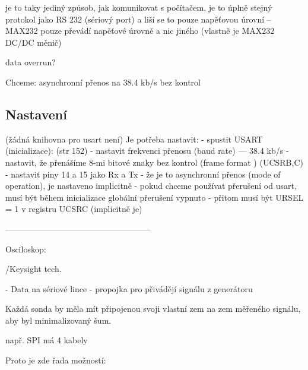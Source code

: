  je to taky jediný způsob, jak komunikovat s počítačem, je to úplně stejný protokol jako RS 232 (sériový port) a liší se to pouze napěťovou úrovní -- MAX232 pouze převádí napěťové úrovně a nic jiného (vlastně je MAX232 DC/DC měnič)
 
 data overrun? 
 
Chceme: asynchronní přenos na 38.4 kb/s bez kontrol  


\subsection{Nastavení}

(žádná knihovna pro usart není)
Je potřeba nastavit: 
- spustit USART (inicializace):  (str 152)
   - nastavit frekvenci přenosu (baud rate)  --- 38.4 kb/s 
   - nastavit, že přenášíme 8-mi bitové znaky bez kontrol  (frame format ) (UCSRB,C)
   - nastavit piny 14 a 15 jako Rx a Tx 
   - že je to  asynchronní přenos (mode of operation), je nastaveno implicitně 
   - pokud chceme používat přerušení od usart, musí být během inicializace 
     globální přerušení vypnuto 
   - přitom musí být URSEL = 1 v registru UCSRC (implicitně je)
   
   
  
  -----------------------------------------------------
  
   Osciloskop: 
   
   /Keysight tech.
   
   
   - Data na sériové lince 
   - propojka pro přivádějí signálu z generátoru 

   Každá sonda by měla mít  připojenou svoji vlastní zem na zem měřeného signálu, aby byl minimalizovaný šum.
   
   např. SPI má 4 kabely 
   
   Proto je zde řada možností: 
 


 
 



 

 

